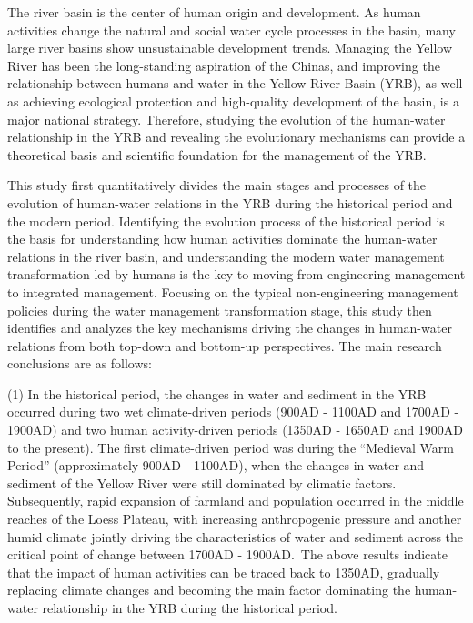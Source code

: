 \begin{eabstract}
  The river basin is the center of human origin and development. As human activities change the natural and social water cycle processes in the basin, many large river basins show unsustainable development trends. Managing the Yellow River has been the long-standing aspiration of the Chinas, and improving the relationship between humans and water in the Yellow River Basin (YRB), as well as achieving ecological protection and high-quality development of the basin, is a major national strategy. 
  Therefore, studying the evolution of the human-water relationship in the YRB and revealing the evolutionary mechanisms can provide a theoretical basis and scientific foundation for the management of the YRB.\

  This study first quantitatively divides the main stages and processes of the evolution of human-water relations in the YRB during the historical period and the modern period. Identifying the evolution process of the historical period is the basis for understanding how human activities dominate the human-water relations in the river basin, and understanding the modern water management transformation led by humans is the key to moving from engineering management to integrated management.
  Focusing on the typical non-engineering management policies during the water management transformation stage, this study then identifies and analyzes the key mechanisms driving the changes in human-water relations from both top-down and bottom-up perspectives. The main research conclusions are as follows:

  (1) In the historical period, the changes in water and sediment in the YRB occurred during two wet climate-driven periods (900AD - 1100AD and 1700AD - 1900AD) and two human activity-driven periods (1350AD - 1650AD and 1900AD to the present). The first climate-driven period was during the ``Medieval Warm Period'' (approximately 900AD - 1100AD), when the changes in water and sediment of the Yellow River were still dominated by climatic factors. Subsequently, rapid expansion of farmland and population occurred in the middle reaches of the Loess Plateau, with increasing anthropogenic pressure and another humid climate jointly driving the characteristics of water and sediment across the critical point of change between 1700AD - 1900AD.\ The above results indicate that the impact of human activities can be traced back to 1350AD, gradually replacing climate changes and becoming the main factor dominating the human-water relationship in the YRB during the historical period.


\end{eabstract}
